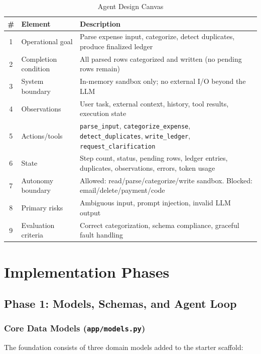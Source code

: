 \documentclass[12pt,a4paper]{article}
\begin{document}
\begin{table}[H]
\centering
\begin{tabular}{@{}clp{9cm}@{}}
\toprule
\# & Element & Description \\
\midrule
1 & Operational goal & Parse expense input, categorize, detect duplicates, produce finalized ledger \\
2 & Completion condition & All parsed rows categorized and written (no pending rows remain) \\
3 & System boundary & In-memory sandbox only; no external I/O beyond the LLM \\
4 & Observations & User task, external context, history, tool results, execution state \\
5 & Actions/tools & \texttt{parse\_input}, \texttt{categorize\_expense}, \texttt{detect\_duplicates}, \texttt{write\_ledger}, \texttt{request\_clarification} \\
6 & State & Step count, status, pending rows, ledger entries, duplicates, observations, errors, token usage \\
7 & Autonomy boundary & Allowed: read/parse/categorize/write sandbox. Blocked: email/delete/payment/code \\
8 & Primary risks & Ambiguous input, prompt injection, invalid LLM output \\
9 & Evaluation criteria & Correct categorization, schema compliance, graceful fault handling \\
\bottomrule
\end{tabular}
\caption{Agent Design Canvas}
\end{table}

\section{Implementation Phases}

\subsection{Phase 1: Models, Schemas, and Agent Loop}

\subsubsection{Core Data Models (\texttt{app/models.py})}

The foundation consists of three domain models added to the starter scaffold:
\end{document}
